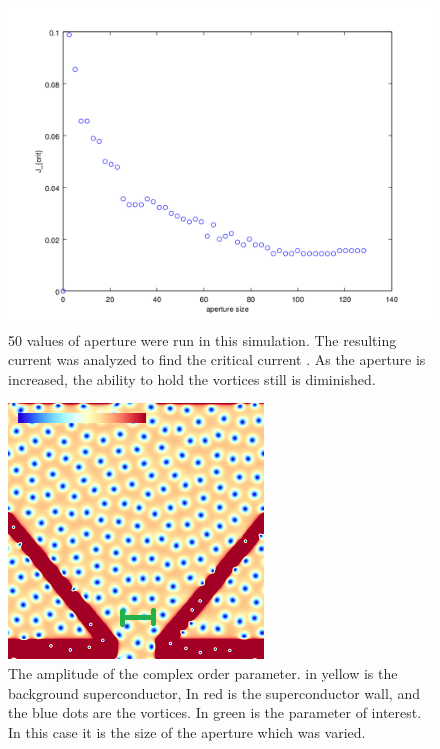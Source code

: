 \begin{figure}[htbp]
\begin{center}
\includegraphics[scale=.50]{flatScan.png}
\caption{ 50 values of aperture were run in this simulation. The resulting current was analyzed to find the critical current . As the aperture is increased, the ability to hold the vortices still is diminished. }
\label{flatScan}
\end{center}
\end{figure}


\begin{figure}[htbp]
\begin{center}
\includegraphics[scale=.50]{normalX.png}
\caption{ The amplitude of the complex order parameter. in yellow is the background superconductor, In red is the superconductor wall, and the blue dots are the vortices. In green is the parameter of interest. In this case it is the size of the aperture which was varied. }
\label{normalX}
\end{center}
\end{figure}

